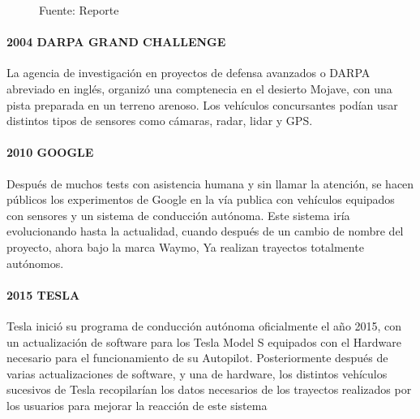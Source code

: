 \begin{figure}[H]
    \centering
    \qquad
    \caption[DAVE]{Fuente: Reporte \citep{LeCun:04-dave}}%
    \label{dave}%
\end{figure}

\paragraph{2004 DARPA GRAND CHALLENGE}
La agencia de investigación en proyectos de defensa avanzados o DARPA abreviado en inglés, organizó una comptenecia en el desierto Mojave, con una pista preparada en un terreno arenoso. Los vehículos concursantes podían usar distintos tipos de sensores como cámaras, radar, lidar y GPS. \citep{hooper_2004}

\paragraph{2010 GOOGLE}
Después de muchos tests con asistencia humana y sin llamar la atención, se hacen públicos los experimentos de Google en la vía publica con vehículos equipados con sensores y un sistema de conducción autónoma. Este sistema iría evolucionando hasta la actualidad, cuando después de un cambio de nombre del proyecto, ahora bajo la marca Waymo, Ya realizan trayectos totalmente autónomos. \citep{markoff_2010}

\paragraph{2015 TESLA}
Tesla inició su programa de conducción autónoma oficialmente el año 2015, con un actualización de software para los Tesla Model S equipados con el Hardware necesario para el funcionamiento de su Autopilot. \citep{nelson_2015} Posteriormente después de varias actualizaciones de software, y una de hardware, los distintos vehículos sucesivos de Tesla recopilarían los datos necesarios de los trayectos realizados por los usuarios para mejorar la reacción de este sistema \citep{karpathy-scaledml}

